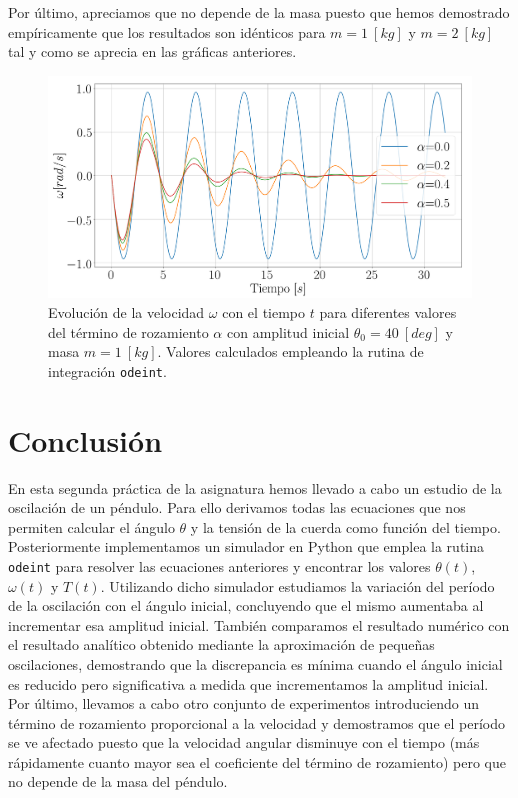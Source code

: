 \documentclass[journal]{IEEEtran}
\begin{document}
Por último, apreciamos que no depende de la masa puesto que hemos demostrado empíricamente que los resultados son idénticos para $m=1~[kg]$ y $m=2~[kg]$ tal y como se aprecia en las gráficas anteriores.

\begin{figure}[!htb]
  \centering
  \includegraphics[width=\linewidth]{alpha_omega}
  \caption{Evolución de la velocidad $\omega$ con el tiempo $t$ para diferentes valores del término de rozamiento $\alpha$ con amplitud inicial $\theta_0=40~[deg]$ y masa $m=1~[kg]$. Valores calculados empleando la rutina de integración \texttt{odeint}.}
  \label{fig:alpha_omega}
\end{figure}

\section{Conclusión}

En esta segunda práctica de la asignatura hemos llevado a cabo un estudio de la oscilación de un péndulo. Para ello derivamos todas las ecuaciones que nos permiten calcular el ángulo $\theta$ y la tensión de la cuerda como función del tiempo. Posteriormente implementamos un simulador en Python que emplea la rutina \texttt{odeint} para resolver las ecuaciones anteriores y encontrar los valores $\theta(t)$, $\omega(t)$ y $T(t)$. Utilizando dicho simulador estudiamos la
variación del período de la oscilación con el ángulo inicial, concluyendo que el mismo aumentaba al incrementar esa amplitud inicial. También comparamos el resultado numérico con el resultado analítico obtenido mediante la aproximación de pequeñas oscilaciones, demostrando que la discrepancia es mínima cuando el ángulo inicial es reducido pero significativa a medida que incrementamos la amplitud inicial. Por último, llevamos a cabo otro conjunto de
experimentos introduciendo un término de rozamiento proporcional a la velocidad y demostramos que el período se ve afectado puesto que la velocidad angular disminuye con el tiempo (más rápidamente cuanto mayor sea el coeficiente del término de rozamiento) pero que no depende de la masa del péndulo.
\end{document}
